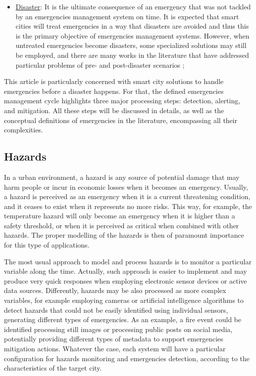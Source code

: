 \begin{refsection}
\begin{itemize}
  \item \underline{Disaster}: It is the ultimate consequence of an emergency that was not tackled by an emergencies management system on time. It is expected that smart cities will treat emergencies in a way that disasters are avoided and thus this is the primary objective of emergencies management systems. However, when untreated emergencies become disasters, some specialized solutions may still be employed, and there are many works in the literature that have addressed particular problems of pre- and post-disaster scenarios \cite{citiesdisasters1,citiesdisasters2};
\end{itemize}

This article is particularly concerned with smart city solutions to handle emergencies before a disaster happens. For that, the defined emergencies management cycle highlights three major processing steps: detection, alerting, and mitigation. All these steps will be discussed in details, as well as the conceptual definitions of emergencies in the literature, encompassing all their complexities. 

\subsection {Hazards}

In a urban environment, a hazard is any source of potential damage that may harm people or incur in economic losses when it becomes an emergency. Usually, a hazard is perceived as an emergency when it is a current threatening condition, and it ceases to exist when it represents no more risks. This way, for example, the temperature hazard will only become an emergency when it is higher than a safety threshold, or when it is perceived as critical when combined with other hazards. The proper modelling of the hazards is then of paramount importance for this type of applications.

The most usual approach to model and process hazards is to monitor a particular variable along the time. Actually, such approach is easier to implement and may produce very quick responses when employing electronic sensor devices or active data sources. Differently, hazards may be also processed as more complex variables, for example employing cameras \cite{emergenciesmetric3} or artificial intelligence algorithms \cite{emergenciesAI1} to detect hazards that could not be easily identified using individual sensors, generating different types of emergencies. As an example, a fire event could be identified processing still images or processing public posts on social media, potentially providing different types of metadata to support emergencies mitigation actions. Whatever the case, each system will have a particular configuration for hazards monitoring and emergencies detection, according to the characteristics of the target city.


\end{refsection}
